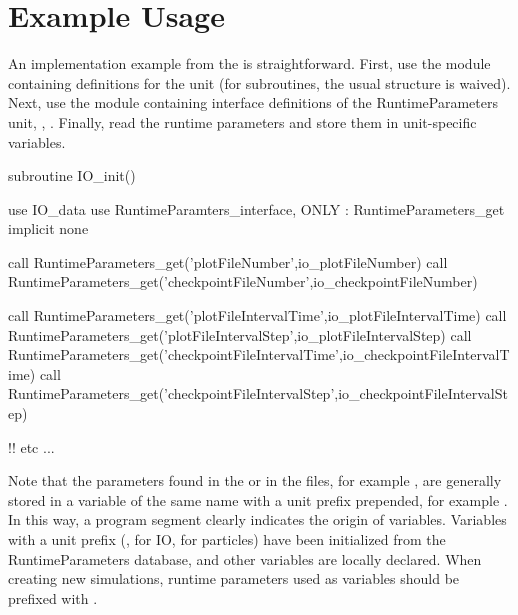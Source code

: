 \section{Example Usage}
An implementation example from the  is
straightforward.  First, use the module containing definitions for the
unit (for  subroutines, the usual  structure is waived).  Next, use the module containing
interface definitions of the \unit{RuntimeParameters} unit, \ie, 
.
Finally, read the runtime
parameters and store them in unit-specific variables.
\begin{codeseg}
subroutine IO_init()

  use IO_data
  use RuntimeParamters_interface, ONLY : RuntimeParameters_get
  implicit none



  call RuntimeParameters_get('plotFileNumber',io_plotFileNumber)
  call RuntimeParameters_get('checkpointFileNumber',io_checkpointFileNumber)

  call RuntimeParameters_get('plotFileIntervalTime',io_plotFileIntervalTime)
  call RuntimeParameters_get('plotFileIntervalStep',io_plotFileIntervalStep)
  call RuntimeParameters_get('checkpointFileIntervalTime',io_checkpointFileIntervalTime)
  call RuntimeParameters_get('checkpointFileIntervalStep',io_checkpointFileIntervalStep)

  !! etc ...
\end{codeseg}
Note that the parameters found in the  or in the  files,
for example , are
generally stored in a variable of the same name with a unit prefix prepended, for example .
In this way, a program segment clearly indicates the origin of variables.
Variables with a unit prefix (\eg,  for \unit{IO},
 for particles) have been initialized from the \unit{RuntimeParameters} database, and other variables are locally declared.
When creating new simulations, runtime parameters used as variables should be prefixed with .

